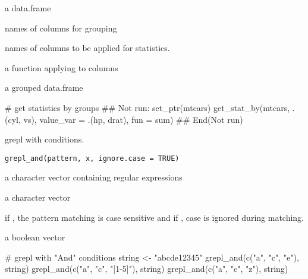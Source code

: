\documentclass[letterpaper]{book}
\begin{document}
%
\begin{Arguments}
\begin{ldescription}
\item[\code{df}] a data.frame

\item[\code{group\_var}] names of columns for grouping

\item[\code{value\_var}] names of columns to be applied for statistics.

\item[\code{fun}] a function applying to columns
\end{ldescription}
\end{Arguments}
%
\begin{Value}
a grouped data.frame
\end{Value}
%
\begin{Examples}
\begin{ExampleCode}
# get statistics by groups
## Not run: 
set_ptr(mtcars)
get_stat_by(mtcars, .(cyl, vs), value_var = .(hp, drat), fun = sum)
## End(Not run)

\end{ExampleCode}
\end{Examples}
%
\begin{Description}
grepl with  conditions.
\end{Description}
%
\begin{Usage}
\begin{verbatim}
grepl_and(pattern, x, ignore.case = TRUE)
\end{verbatim}
\end{Usage}
%
\begin{Arguments}
\begin{ldescription}
\item[\code{pattern}] a character vector containing regular expressions

\item[\code{x}] a character vector

\item[\code{ignore.case}] if , the pattern matching is case sensitive and
if , case is ignored during matching.
\end{ldescription}
\end{Arguments}
%
\begin{Value}
a boolean vector
\end{Value}
%
\begin{Examples}
\begin{ExampleCode}
# grepl with "And" conditions
string <- "abcde12345"
grepl_and(c("a", "c", "e"), string)
grepl_and(c("a", "c", "[1-5]"), string)
grepl_and(c("a", "c", "z"), string)

\end{ExampleCode}
\end{Examples}
\end{document}
